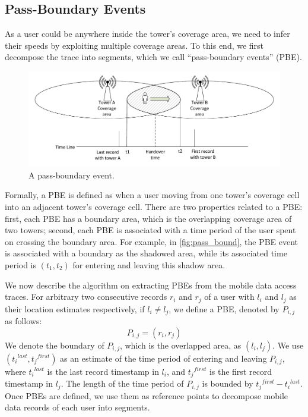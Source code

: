 \subsection{Pass-Boundary Events}

As a user could be anywhere inside the tower's coverage area, we need to infer their speeds by exploiting multiple coverage areas. To this end, we first decompose the trace into segments, which we call ``pass-boundary events'' (PBE).

\begin{figure}[h]
    \centering
    \includegraphics[width=\linewidth]{./figures/passing_boundary.pdf}
    \vspace{-0.3in}
    \caption{A pass-boundary event.}
    \label{fig:pass_bound}
\end{figure}


Formally, a PBE is defined as when a user moving from one tower's coverage cell into an adjacent tower's coverage cell. There are two properties related to a PBE: first, each PBE has a boundary area, which is the overlapping coverage area of two towers; second, each PBE is associated with a time period of the user spent on crossing the boundary area. For example, in \autoref{fig:pass_bound}, the PBE event is associated with a boundary as the shadowed area, while its associated time period is $(t_1, t_2)$ for entering and leaving this shadow area.

We now describe the algorithm on extracting PBEs from the mobile data access traces. For arbitrary two consecutive records $r_i$ and $r_j$ of a user with $l_i$ and $l_j$ as their location estimates respectively, if $l_i \neq l_j$, we define a PBE, denoted by $P_{i, j}$ as follows:
\[
P_{i,j} = (r_i, r_j)
\]
We denote the boundary of $P_{i, j}$, which is the overlapped area, as $(l_i, l_j)$. We use $({t_i}^{last}, {t_j}^{first})$ as an estimate of the time period of entering and leaving $P_{i, j}$, where ${t_i}^{last}$ is the last record timestamp in $l_i$, and ${t_j}^{first}$ is the first record timestamp in $l_j$. The length of the time period of $P_{i, j}$ is bounded by ${t_j}^{first} - {t_i}^{last}$.
Once PBEs are defined, we use them as reference points to decompose mobile data records of each user into segments.

